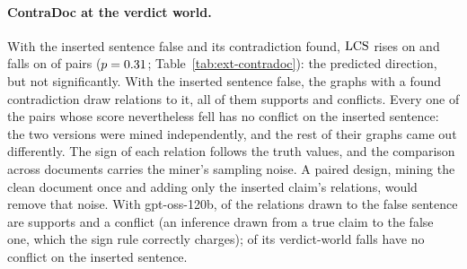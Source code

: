 \paragraph{ContraDoc at the verdict world.} With the inserted sentence false and its
contradiction found, $\mathrm{LCS}$ rises on \extCdVerdEdgeIncGpt{} and falls on \extCdVerdEdgeDecGpt{} of
\extCdVerdEdgeNGpt{} pairs ($p=0.31$; Table~\ref{tab:ext-contradoc}): the predicted
direction, but not significantly. With the inserted sentence false, the \extCdAssertEdgeNGpt{} graphs with a
found contradiction draw \extCdEvSupGpt{} relations to it, all of them supports and
\extCdEvConGpt{} conflicts. Every one of the \extCdVerdFallsGpt{} pairs whose score nevertheless
fell has no conflict on the inserted sentence: the two versions were mined independently, and
the rest of their graphs came out differently. The sign of each relation follows the truth
values, and the comparison across documents carries the miner's sampling noise. A paired design,
mining the clean document once and adding only the inserted claim's relations, would remove that
noise. With gpt-oss-120b, \extCdEvSupOss{} of the relations drawn to the false sentence
are supports and \extCdEvConOss{} a conflict (an inference drawn from a true claim to the false
one, which the sign rule correctly charges); \extCdVerdFallsNoConOss{} of its \extCdVerdFallsOss{}
verdict-world falls have no conflict on the inserted sentence.

